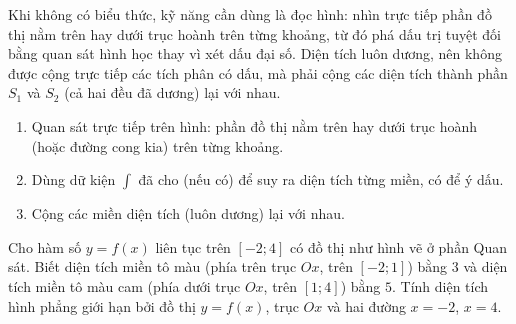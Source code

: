 \begin{hopyduong}
Khi không có biểu thức, kỹ năng cần dùng là đọc hình: nhìn trực tiếp phần đồ thị nằm trên hay dưới trục hoành trên từng khoảng, từ đó phá dấu trị tuyệt đối bằng quan sát hình học thay vì xét dấu đại số. Diện tích luôn dương, nên không được cộng trực tiếp các tích phân có dấu, mà phải cộng các diện tích thành phần $S_1$ và $S_2$ (cả hai đều đã dương) lại với nhau.
\end{hopyduong}

\begin{hopphuongphap}
\begin{enumerate}[leftmargin=1cm]
  \item Quan sát trực tiếp trên hình: phần đồ thị nằm trên hay dưới trục hoành (hoặc đường cong kia) trên từng khoảng.
  \item Dùng dữ kiện $\displaystyle\int$ đã cho (nếu có) để suy ra diện tích từng miền, có để ý dấu.
  \item Cộng các miền diện tích (luôn dương) lại với nhau.
\end{enumerate}
\end{hopphuongphap}

\begin{hopvidu}
Cho hàm số $y=f(x)$ liên tục trên $[-2;4]$ có đồ thị như hình vẽ ở phần Quan sát. Biết diện tích miền tô màu (phía trên trục $Ox$, trên $[-2;1]$) bằng $3$ và diện tích miền tô màu cam (phía dưới trục $Ox$, trên $[1;4]$) bằng $5$. Tính diện tích hình phẳng giới hạn bởi đồ thị $y=f(x)$, trục $Ox$ và hai đường $x=-2$, $x=4$.
\end{hopvidu}

